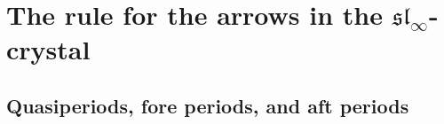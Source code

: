 \documentclass[12pt]{amsart}
\numberwithin{equation}{section}
\theoremstyle{definition}
\newcommand{\slinf}{\mathfrak{sl}_\infty}
\begin{document}






\section{The rule for the arrows in the $\slinf$-crystal}\label{S-crystal edges}
\subsection{Quasiperiods, fore periods, and aft periods}
\end{document}
